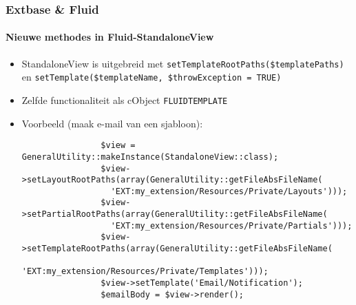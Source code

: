 \begin{frame}[fragile]
	\frametitle{Extbase \& Fluid}
	\framesubtitle{Nieuwe methodes in Fluid-StandaloneView}

	\lstset{basicstyle=\tiny\ttfamily}

	\begin{itemize}

		\item StandaloneView is uitgebreid met
			\texttt{setTemplateRootPaths(\$templatePaths)} en
			\texttt{setTemplate(\$templateName, \$throwException = TRUE)}

		\item Zelfde functionaliteit als cObject \texttt{FLUIDTEMPLATE}

		\item Voorbeeld (maak e-mail van een sjabloon):

			\begin{lstlisting}
				$view = GeneralUtility::makeInstance(StandaloneView::class);
				$view->setLayoutRootPaths(array(GeneralUtility::getFileAbsFileName(
				  'EXT:my_extension/Resources/Private/Layouts')));
				$view->setPartialRootPaths(array(GeneralUtility::getFileAbsFileName(
				  'EXT:my_extension/Resources/Private/Partials')));
				$view->setTemplateRootPaths(array(GeneralUtility::getFileAbsFileName(
				  'EXT:my_extension/Resources/Private/Templates')));
				$view->setTemplate('Email/Notification');
				$emailBody = $view->render();
			\end{lstlisting}

	\end{itemize}

\end{frame}


